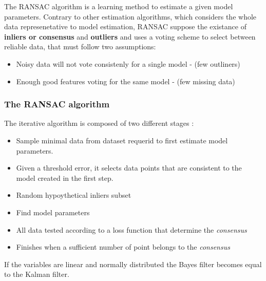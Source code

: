 The RANSAC algorithm is a learning method to estimate a given model parameters. Contrary to other estimation algorithms, which considers the whole data represenetative to model estimation, RANSAC suppose the existance of \textbf{inliers or consensus} and \textbf{outliers}  and uses a voting scheme to select between reliable data, that must follow two assumptions: 

\begin{itemize}
\item Noisy data will not vote consistenly for a single model - (few outliners) 
\item Enough good features voting for the same model - (few missing data)
\end{itemize}

\subsubsection{The RANSAC algorithm}

The iterative algorithm is composed of two different stages : 
\begin {itemize}
\item Sample minimal data from dataset requerid to first estimate model parameters.
\item Given a threshold error, it selects data points that are consistent to the model created in the first step.
\end {itemize}

\begin{itemize}
\item Random hypoythetical inliers subset
\item Find model parameters
\item All data tested according to a loss function that determine the \textit{consensus}
\item Finishes when a sufficient number of point belongs to the \textit{consensus}
\end{itemize}

\center \large{\color{blue} If the variables are linear and normally distributed the Bayes filter becomes equal to the Kalman filter.}



